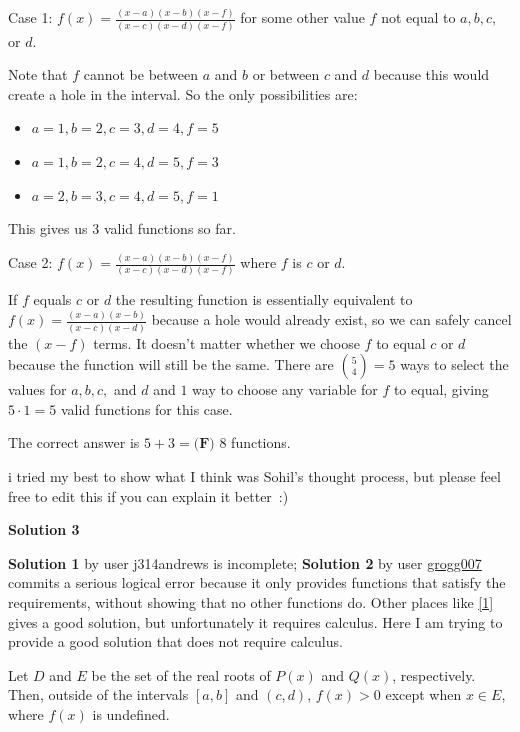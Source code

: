 \begin{enumerate}
 Case 1: $f(x) = \frac{(x-a)(x-b)(x-f)}{(x-c)(x-d)(x-f)}$ for some other value $f$ not equal to $a, b, c,$ or $d.$ 

 Note that $f$ cannot be between $a$ and $b$ or between $c$ and $d$ because this would create a hole in the interval. So the only possibilities are: 

 
            \begin{itemize}
        \item $a = 1, b = 2, c = 3, d = 4, f = 5$
        \item $a = 1, b = 2, c = 4, d = 5, f = 3$
        \item $a = 2, b = 3, c = 4, d = 5, f = 1$
            \end{itemize}
            This gives us $3$ valid functions so far.

 
Case 2: $f(x) = \frac{(x-a)(x-b)(x-f)}{(x-c)(x-d)(x-f)}$ where $f$ is $c$ or $d.$

 If $f$ equals $c$ or $d$ the resulting function is essentially equivalent to $f(x) = \frac{(x-a)(x-b)}{(x-c)(x-d)}$ because a hole would already exist, so we can safely cancel the $(x-f)$ terms. It doesn't matter whether we choose $f$ to equal $c$ or $d$ because the function will still be the same. There are $\binom{5}{4} = 5$ ways to select the values for $a, b, c,$ and $d$ and $1$ way to choose any variable for $f$ to equal, giving $5 \cdot 1 = 5$ valid functions for this case. 

 
The correct answer is $5 + 3 = \boxed{\textbf{(F) } 8}$ functions.

 
i tried my best to show what I think was Sohil's thought process, but please feel free to edit this if you can explain it better :)

 



\textbf{Solution 3}

\textbf{Solution 1} by user j314andrews is incomplete; \textbf{Solution 2} by user \href{https://artofproblemsolving.com/wiki/index.php?title=User:Grogg007}{grogg007} commits a serious logical error because it only provides functions that satisfy the requirements, without showing that no other functions do. Other places like \href{https://wiki.randommath.com/amc12/2025/part-a/problem-25}{[1]} gives a good solution, but unfortunately it requires calculus. Here I am trying to provide a good solution that does not require calculus.

 
Let $D$ and $E$ be the set of the real roots of $P(x)$ and $Q(x)$, respectively. Then, outside of the intervals $[a,b]$ and $(c,d)$, $f(x)>0$ except when $x \in E$, where $f(x)$ is undefined. 


\end{enumerate}

